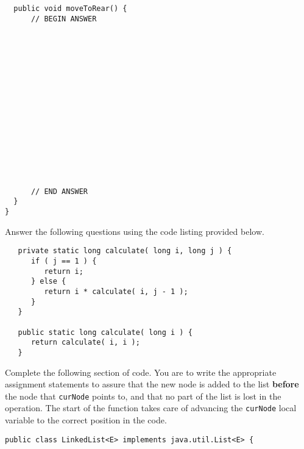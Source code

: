 \documentclass[11pt]{exam}
\begin{document}
\begin{questions}
\begin{verbatim}
  public void moveToRear() {
      // BEGIN ANSWER
















      // END ANSWER
  }
}
\end{verbatim}

\newpage
\question Answer the following questions using the code listing provided below.
\begin{lstlisting}
   private static long calculate( long i, long j ) {
      if ( j == 1 ) {
         return i;
      } else {
         return i * calculate( i, j - 1 );
      }
   }
   
   public static long calculate( long i ) {
      return calculate( i, i );
   }
\end{lstlisting}


\newpage
\question[10] Complete the following section of code.   You are to write the appropriate assignment statements to assure that the new node is added to the list {\bf before} the node that {\tt curNode} points to, and that no part of the list is lost in the operation.   The start of the function takes care of advancing the {\tt curNode} local variable to the correct position in the code.

\begin{verbatim}
public class LinkedList<E> implements java.util.List<E> {


\end{verbatim}
\end{questions}
\end{document}
